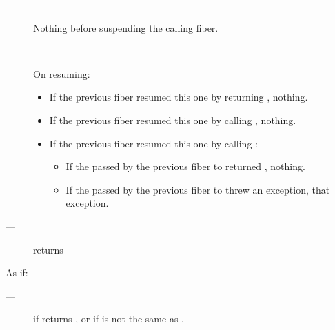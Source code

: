 \except
\begin{description}
    \item[---] Nothing before suspending the calling fiber.
    \item[---] On resuming:
    \begin{itemize}
        \item If the previous fiber resumed this one by returning \fiber,
              nothing.
        \item If the previous fiber resumed this one by calling \someresume,
              nothing.
        \item If the previous fiber resumed this one by calling \anyresumewith:
        \begin{itemize}
            \item If the  passed by the previous fiber
                  to \anyresumewith returned \fiber, nothing.
            \item If the  passed by the previous fiber
                  to \anyresumewith threw an exception, that exception.
        \end{itemize}
    \end{itemize}
\end{description}

\postcond
\begin{description}
    \item[---]  returns 
\end{description}




\effects
As-if:\\


\returns
\begin{description}
    \item[---]  if  returns , or if \currthread is not the same
        as \lastthread.
\end{description}

